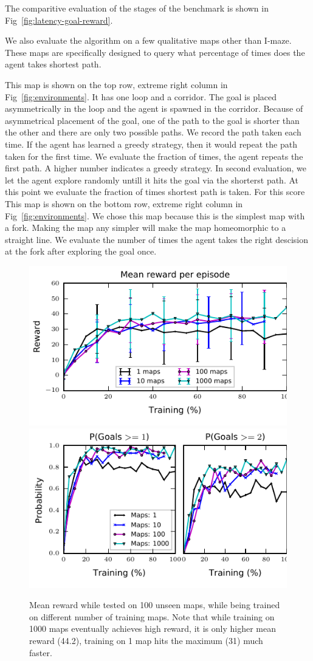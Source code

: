 The comparitive evaluation of the stages of the benchmark is shown in Fig~\ref{fig:latency-goal-reward}.

We also evaluate the algorithm on a few qualitative maps other than I-maze. These maps are specifically designed to query what percentage of times does the agent takes shortest path.

\setcounter{Benchmark}{0}
\begin{description}
    This map is shown on the top row, extreme right column in Fig~\ref{fig:environments}. It has one loop and a corridor.
    The goal is placed asymmetrically in the loop and the agent is spawned in the corridor.
    Because of asymmetrical placement of the goal, one of the path to the goal is shorter than the other and there are only two possible paths.
    We record the path taken each time. If the agent has learned a greedy strategy, then it would repeat the path taken for the first time.
    We evaluate the fraction of times, the agent repeats the first path. A higher number indicates a greedy strategy.
    In second evaluation, we let the agent explore randomly untill it hits the goal via the shorterst path.
    At this point we evaluate the  fraction of times shortest path is taken. For this score 
    This map is shown on the bottom row, extreme right column in Fig~\ref{fig:environments}.
    We chose this map because this is the simplest map with a fork. Making the map any simpler will make the map homeomorphic to a straight line. 
    We evaluate the number of times the agent takes the right descision at the fork after exploring the goal once.
\end{description}

\begin{figure}%
\includegraphics[width=0.5\columnwidth]{images/plot_reward_3D-1000.pdf}%
\includegraphics[width=0.5\columnwidth]{images/plot_probability_3D-1000.pdf}%
\vspace{-1em}%
\caption{Mean reward while tested on 100 unseen maps, while being trained on different number of training maps. Note that while training on 1000 maps eventually achieves high reward, it is only higher mean reward (44.2), training on 1 map hits the maximum (31) much faster.}%
\label{fig:plot_reward_on_testing}%
\end{figure}

